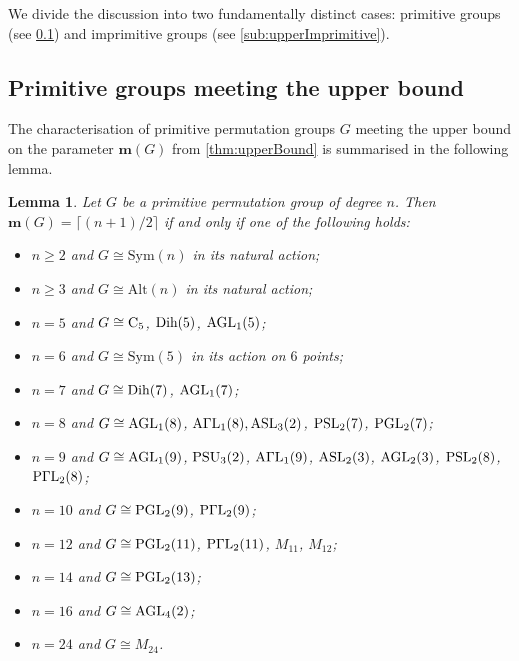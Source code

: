 \documentclass[a4paper]{amsart}
\newcommand{\Sym}{\mathrm{Sym}}
\newcommand{\Alt}{\mathrm{Alt}}
\newcommand{\m}{\mathbf{m}}
\newtheorem{lemma}[theorem]{Lemma}
\theoremstyle{definition}
\begin{document}
We divide the discussion into two fundamentally distinct cases: primitive groups (see \cref{sub:upperPrimitive}) and imprimitive groups (see \cref{sub:upperImprimitive}). 

\subsection{Primitive groups meeting the upper bound}
\label{sub:upperPrimitive}

The characterisation of primitive permutation groups $G$ meeting the upper bound on the parameter $\m(G)$ from 
\cref{thm:upperBound} is summarised in the following lemma.

\begin{lemma}
\label{lemma:complementB}
    Let $G$ be a primitive permutation group of degree $n$. Then $\m(G) = \lceil(n+1) /2 \rceil$ if and only if 
    one of the following holds: 
      \begin{itemize}
       \item $n\ge 2$ and $G\cong \Sym(n)$ in its natural action;
       \item $n\ge 3$ and $G\cong \Alt(n)$ in its natural action;
       \item $n=5$ and $G\cong {\rm C}_5$, $ {\rm Dih(5)}$, $ {\rm AGL}_1(5)$;
       \item $n=6$ and $G\cong \Sym(5)$ in its action on $6$ points;
       \item $n=7$ and $G\cong {\rm Dih}(7)$, ${\rm AGL}_1(7)$;
       \item $n=8$ and $G\cong {\rm AGL}_1(8)$, ${\rm A\Gamma L}_1(8),{\rm ASL}_3(2)$, ${\rm PSL}_2(7)$, ${\rm PGL}_2(7)$;
       \item $n=9$ and $G\cong {\rm AGL}_1(9)$, ${\rm PSU}_3(2)$, %
             ${\rm A\Gamma L}_1(9)$, ${\rm ASL}_2(3)$, ${\rm AGL}_2(3)$, ${\rm PSL}_2(8)$, ${\rm P\Gamma L}_2(8)$;
      \item $n=10$ and $G\cong {\rm PGL}_2(9)$, ${\rm P\Gamma L}_2(9)$;
      \item $n=12$ and $G\cong {\rm PGL}_2(11)$, ${\rm P\Gamma L}_2(11)$, $M_{11}$, $M_{12}$;
      \item $n=14$ and $G\cong {\rm PGL}_2(13)$;
      \item $n=16$ and $G\cong {\rm AGL}_4(2)$;
      \item $n=24$ and $G\cong M_{24}$.
      \end{itemize}
\end{lemma}
\end{document}
